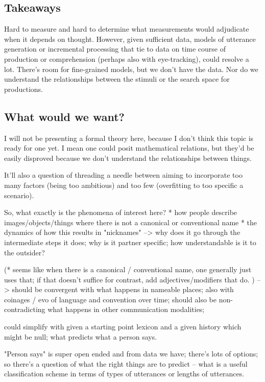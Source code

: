 \documentclass[]{article}
\begin{document}
\subsection{Takeaways}
Hard to measure and hard to determine what measurements would adjudicate when it depends on thought. However, given sufficient data, models of utterance generation or incremental processing that tie to data on time course of production or comprehension (perhaps also with eye-tracking), could resolve a lot. There's room for fine-grained models, but we don't have the data. Nor do we understand the relationships between the stimuli or the search space for productions. 


	\subsection{What would we want?}
	
	I will not be presenting a formal theory here, because I don't think this topic is ready for one yet. I mean one could posit mathematical relations, but they'd be easily disproved because we don't understand the relationships between things. 
	
	It'll also a question of threading a needle between aiming to incorporate too many factors (being too ambitious) and too few (overfitting to too specific a scenario). 
	
	So, what exactly is the phenomena of interest here? 
	* how people describe images/objects/things where there is not a canonical or conventional name 
	* the dynamics of how this results in "nicknames" 
	--> why does it go through the intermediate steps it does; why is it partner specific; how understandable is it to the outsider? 
	
	(* seems like when there is a canonical / conventional name, one generally just uses that; if that doesn't suffice for contrast, add adjectives/modifiers that do. )
	-- > should be convergent with what happens in nameable places; also with coinages / evo of language and convention over time; should also be non-contradicting what happens in other communication modalities; 
	
	could simplify with given a starting point lexicon and a given history which might be null; what predicts what a person says. 
	
	"Person says" is super open ended and from data we have; there's lots of options; so there's a question of what the right things are to predict -- what is a useful classification scheme in terms of types of utterances or lengths of utterances. 
	
\end{document}
